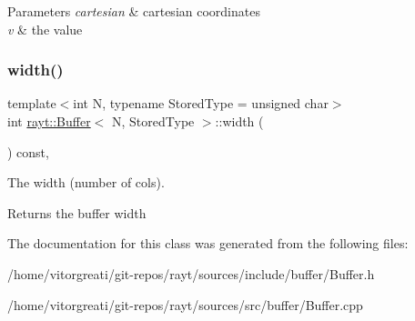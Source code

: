 \begin{DoxyParams}{Parameters}
{\em cartesian} & cartesian coordinates \\
\hline
{\em v} & the value \\
\hline
\end{DoxyParams}
\mbox{\label{classrayt_1_1_buffer_a905edf4ca7a7b88dc2d3dddf7d3b50b6}} 
\subsubsection{\texorpdfstring{width()}{width()}}
{\footnotesize\ttfamily template$<$int N, typename Stored\+Type = unsigned char$>$ \\
int \mbox{\hyperlink{classrayt_1_1_buffer}{rayt\+::\+Buffer}}$<$ N, Stored\+Type $>$\+::width (\begin{DoxyParamCaption}{ }\end{DoxyParamCaption}) const\hspace{0.3cm}{\ttfamily [inline]}, {\ttfamily [noexcept]}}



The width (number of cols). 

\begin{DoxyReturn}{Returns}
the buffer width 
\end{DoxyReturn}


The documentation for this class was generated from the following files\+:\begin{DoxyCompactItemize}
\item 
/home/vitorgreati/git-\/repos/rayt/sources/include/buffer/Buffer.\+h\item 
/home/vitorgreati/git-\/repos/rayt/sources/src/buffer/Buffer.\+cpp\end{DoxyCompactItemize}
